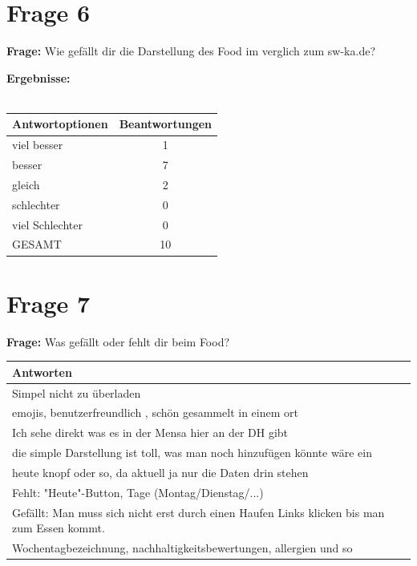 \section{Frage 6}
\textbf{Frage:} Wie gefällt dir die Darstellung des Food im verglich zum sw-ka.de?
\begin{figure}
	\centering
\end{figure}
\textbf{Ergebnisse:}\\
\\
\begin{tabular}{|l|c|}\hline
	\textbf{Antwortoptionen} & \textbf{Beantwortungen} \\\hline
	viel besser  	& 1 \\\hline
	besser			& 7 \\\hline
	gleich 			& 2 \\\hline
	schlechter 		& 0 \\\hline
	viel Schlechter	& 0 \\\hline
	GESAMT			& 10 \\\hline			
\end{tabular}

\section{Frage 7}
\textbf{Frage:} Was gefällt oder fehlt dir beim Food?\\
\begin{tabular}{|l|}\hline
	\textbf{Antworten} \\\hline
	Simpel nicht zu überladen  \\\hline
	emojis, benutzerfreundlich , schön gesammelt in einem ort \\\hline
	Ich sehe direkt was es in der Mensa hier an der DH gibt \\\hline
	die simple Darstellung ist toll, was man noch hinzufügen könnte wäre ein\\
	heute knopf oder so, da aktuell ja nur die Daten drin stehen 
	\\\hline
	Fehlt: "Heute"-Button, Tage (Montag/Dienstag/...)\\
	Gefällt: Man muss sich nicht erst durch einen Haufen Links klicken bis man zum Essen kommt. \\\hline
	Wochentagbezeichnung, nachhaltigkeitsbewertungen, allergien und so \\\hline			
\end{tabular}


